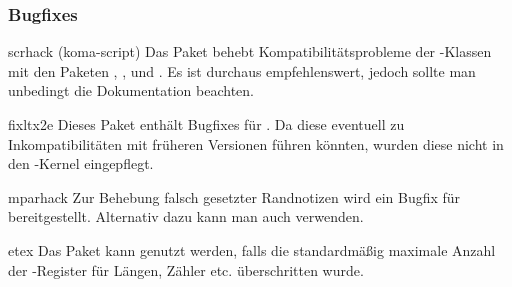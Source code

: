 \subsubsection{Bugfixes}
%
\begin{packages}
\item[scrhack](koma-script)
  Das Paket behebt Kompatibilitätsprobleme der \KOMAScript-Klassen mit den 
  Paketen , ,  und
  . Es ist durchaus empfehlenswert, jedoch sollte man 
  unbedingt die Dokumentation beachten.
\item[fixltx2e]
  Dieses Paket enthält Bugfixes für . Da diese eventuell zu 
  Inkompatibilitäten mit früheren Versionen führen könnten, wurden diese nicht 
  in den -Kernel eingepflegt.
\item[mparhack]
  Zur Behebung falsch gesetzter Randnotizen wird ein Bugfix für 
   bereitgestellt. Alternativ dazu kann man auch 
   verwenden.
\item[etex]
  Das Paket kann genutzt werden, falls die standardmäßig maximale Anzahl der 
  -Register für Längen, Zähler etc. überschritten wurde.
\end{packages}
